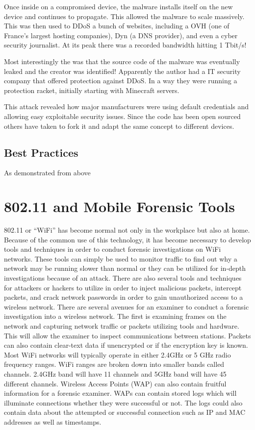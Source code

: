 \documentclass[acmlarge]{style/acmart}
\begin{document}
Once inside on a compromised device, the malware installs itself on the new device and continues to propagate. This allowed the malware to scale massively. This was then used to DDoS a bunch of websites, including a OVH (one of France's largest hosting companies), Dyn (a DNS provider), and even a cyber security journalist. At its peak there was a recorded bandwidth hitting 1 Tbit/s!\cite{Hertzberg_Mirai_2016}

Most interestingly the was that the source code of the malware was eventually leaked and the creator was identified! Apparently the author had a IT security company that offered protection against DDoS. In a way they were running a protection racket, initially starting with Minecraft servers.

This attack revealed how major manufacturers were using default credentials and allowing easy exploitable security issues. Since the code has been open sourced others have taken to fork it and adapt the same concept to different devices.

\subsection{Best Practices}

As demonstrated from above 

\section{802.11 and Mobile Forensic Tools}

802.11 or “WiFi” has become normal not only in the workplace but also at home. Because of the common use of this technology, it has become necessary to develop tools and techniques in order to conduct forensic investigations on WiFi networks. These tools can simply be used to monitor traffic to find out why a network may be running slower than normal or they can be utilized for in-depth investigations because of an attack. There are also several tools and techniques for attackers or hackers to utilize in order to inject malicious packets, intercept packets, and crack network passwords in order to gain unauthorized access to a wireless network. 
There are several avenues for an examiner to conduct a forensic investigation into a wireless network. The first is examining frames on the network and capturing network traffic or packets utilizing tools and hardware. This will allow the examiner to inspect communications between stations. Packets can also contain clear-text data if unencrypted or if the encryption key is known. Most WiFi networks will typically operate in either 2.4GHz or 5 GHz radio frequency ranges. WiFi ranges are broken down into smaller bands called channels. 2.4GHz band will have 11 channels and 5GHz band will have 45 different channels. 
Wireless Access Points (WAP) can also contain fruitful information for a forensic examiner. WAPs can contain stored logs which will illuminate connections whether they were successful or not. The logs could also contain data about the attempted or successful connection such as IP and MAC addresses as well as timestamps. 
\end{document}
